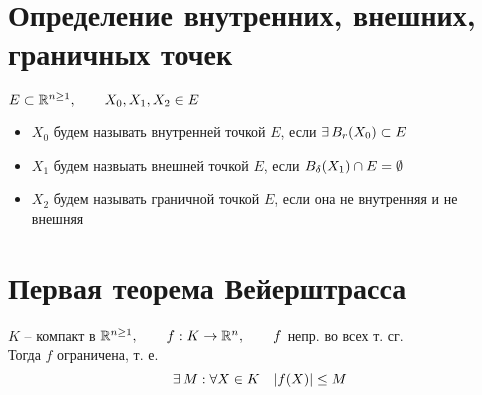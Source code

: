 \section{Определение внутренних, внешних, граничных точек}

\begin{definition}
    $ E \subset \mathbb{R}^{n \ge 1}, \qquad X_0, X_1, X_2 \in E $
    \begin{itemize}
    	\item $ X_0 $ будем называть внутренней точкой $ E $, если $ \exists\, B_r(X_0) \subset E $
        \item $ X_1 $ будем назвыать внешней точкой $ E $, если $ B_\delta(X_1) \cap E = \emptyset $
        \item $ X_2 $ будем называть граничной точкой $ E $, если она не внутренняя и не внешняя
    \end{itemize}
\end{definition}

\section{Первая теорема Вейерштрасса}

\begin{theorem}
    $ K $ -- компакт в $ \mathbb{R}^{n \ge 1}, \qquad f : K \to \mathbb{R}^n, \qquad f $ непр. во всех т. сг. \\
    Тогда $ f $ ограничена, т. е.
    $$ \exists\, M : \forall X \in K \quad |f(X)| \le M $$
\end{theorem}

